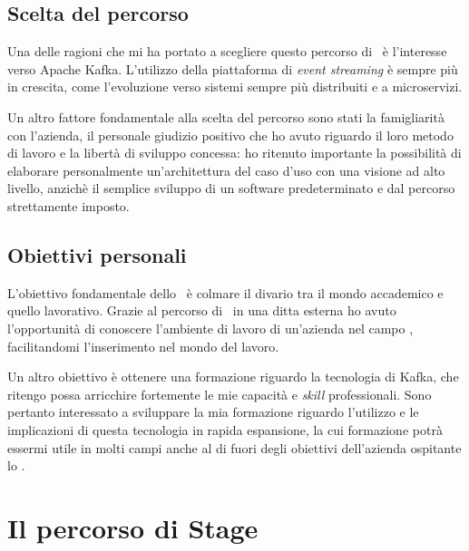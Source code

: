 \subsection{Scelta del percorso}

Una delle ragioni che mi ha portato a scegliere questo percorso di \stage\ è l'interesse verso Apache Kafka.
L'utilizzo della piattaforma di \textit{event streaming} è sempre più in crescita, come l'evoluzione verso sistemi sempre più distribuiti e a microservizi.

Un altro fattore fondamentale alla scelta del percorso sono stati la famigliarità con l'azienda, il personale giudizio positivo che ho avuto riguardo il loro metodo di lavoro e la libertà di sviluppo concessa: ho ritenuto importante la possibilità di elaborare personalmente un'architettura del caso d'uso con una visione ad alto livello, anzichè il semplice sviluppo di un software predeterminato e dal percorso strettamente imposto.

\subsection{Obiettivi personali}
L'obiettivo fondamentale dello \stage\ è colmare il divario tra il mondo accademico e quello lavorativo.
Grazie al percorso di \stage\ in una ditta esterna ho avuto l'opportunità di conoscere l'ambiente di lavoro di un'azienda nel campo , facilitandomi l'inserimento nel mondo del lavoro.

Un altro obiettivo è ottenere una formazione riguardo la tecnologia di Kafka, che ritengo possa arricchire fortemente le mie capacità e \textit{skill} professionali.
Sono pertanto interessato a sviluppare la mia formazione riguardo l'utilizzo e le implicazioni di questa tecnologia in rapida espansione, la cui formazione potrà essermi utile in molti campi anche al di fuori degli obiettivi dell'azienda ospitante lo \stage.


\section{Il percorso di Stage}


%
%

